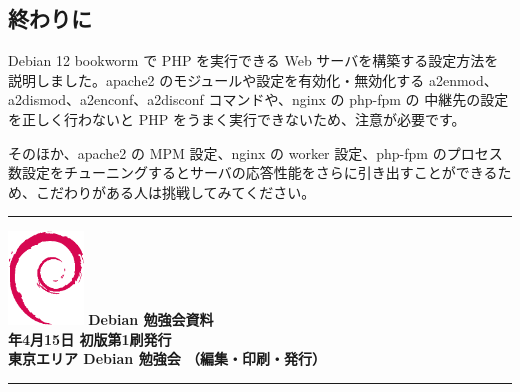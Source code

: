 \documentclass[mingoth,a4paper]{jsarticle}
\newcommand{\debmtgyear}{2023}
\newcommand{\debmtgmonth}{4}
\newcommand{\debmtgdate}{15}
\begin{document}
\subsection{終わりに}

Debian 12 bookworm で PHP を実行できる Web サーバを構築する設定方法を説明しました。apache2 のモジュールや設定を有効化・無効化する a2enmod、a2dismod、a2enconf、a2disconf コマンドや、nginx の php-fpm の 中継先の設定を正しく行わないと PHP をうまく実行できないため、注意が必要です。

そのほか、apache2 の MPM 設定、nginx の worker 設定、php-fpm のプロセス数設定をチューニングするとサーバの応答性能をさらに引き出すことができるため、こだわりがある人は挑戦してみてください。



\mbox{}\newpage
\mbox{}\newpage

\vspace*{15cm}
\hrule
\vspace{2mm}
\includegraphics[width=2cm]{image-assets/openlogo-nd.eps}
\noindent \Large \bf Debian 勉強会資料\\
\noindent \normalfont \debmtgyear{}年\debmtgmonth{}月\debmtgdate{}日 \hspace{5mm}  初版第1刷発行\\
\noindent \normalfont 東京エリア Debian 勉強会 （編集・印刷・発行）\\
\hrule
\end{document}
